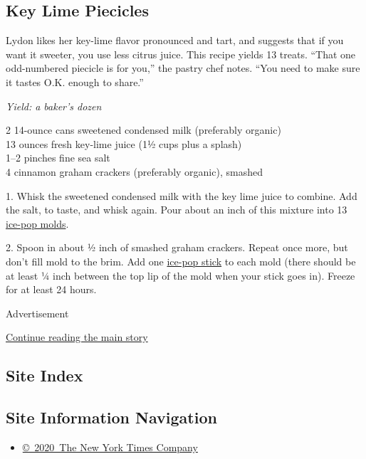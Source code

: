 \hypertarget{key-lime-piecicles}{%
\subsection{Key Lime Piecicles}\label{key-lime-piecicles}}

Lydon likes her key-lime flavor pronounced and tart, and suggests that
if you want it sweeter, you use less citrus juice. This recipe yields 13
treats. ``That one odd-numbered piecicle is for you,'' the pastry chef
notes. ``You need to make sure it tastes O.K. enough to share.''

\emph{Yield: a baker's dozen}

2 14-ounce cans sweetened condensed milk (preferably organic)\\
13 ounces fresh key-lime juice (1½ cups plus a splash)\\
1--2 pinches fine sea salt\\
4 cinnamon graham crackers (preferably organic), smashed

1. Whisk the sweetened condensed milk with the key lime juice to
combine. Add the salt, to taste, and whisk again. Pour about an inch of
this mixture into 13
\href{https://food52.com/shop/products/1272-ice-pop-molds}{ice-pop
molds}.

2. Spoon in about ½ inch of smashed graham crackers. Repeat once more,
but don't fill mold to the brim. Add one
\href{http://www.craftysticks.com/Standard-Food-Safe-Sticks-Natural_p_74.html}{ice-pop
stick} to each mold (there should be at least ¼ inch between the top lip
of the mold when your stick goes in). Freeze for at least 24 hours.

Advertisement

\protect\hyperlink{after-bottom}{Continue reading the main story}

\hypertarget{site-index}{%
\subsection{Site Index}\label{site-index}}

\hypertarget{site-information-navigation}{%
\subsection{Site Information
Navigation}\label{site-information-navigation}}

\begin{itemize}
\tightlist
\item
  \href{https://help.nytimes3xbfgragh.onion/hc/en-us/articles/115014792127-Copyright-notice}{©~2020~The
  New York Times Company}
\end{itemize}

